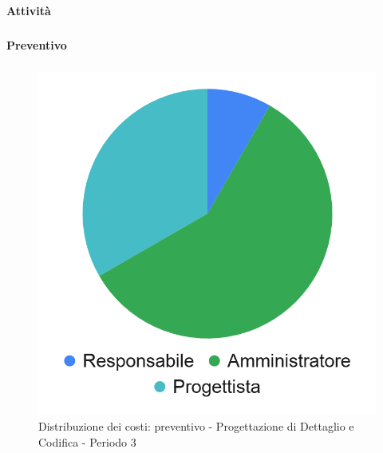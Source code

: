 \paragraph{Attività}
\subparagraph*{}

\planningTable{
	
}

\paragraph{Preventivo}
\subparagraph*{}

\hspace{-1cm}
\begin{minipage}{.50\textwidth}
\smallPreventivoTable{
	
}
\end{minipage}
\hspace{1cm}
\begin{minipage}{.40\textwidth}
\begin{figure}[H]
	\includegraphics[scale=0.21]{res/images/charts/preventivo_priori/Grafico4-8.png}
	\caption{Distribuzione dei costi: preventivo - Progettazione di Dettaglio e Codifica - Periodo 3}
\end{figure}
\end{minipage} 



